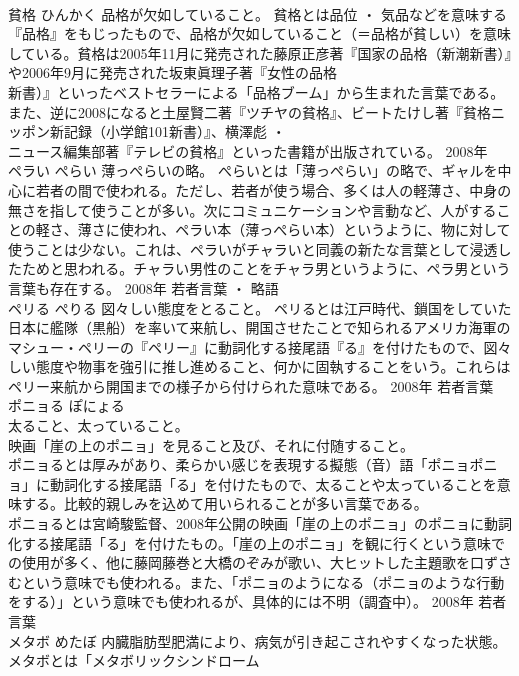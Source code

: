 \documentclass[8pt]{extreport}
\begin{document}
\begin{CJK}{UTF8}{min}
\\	貧格	ひんかく	品格が欠如していること。	貧格とは品位 ・ 気品などを意味する『品格』をもじったもので、品格が欠如していること（＝品格が貧しい）を意味している。貧格は2005年11月に発売された藤原正彦著『国家の品格（新潮新書）』や2006年9月に発売された坂東眞理子著『女性の品格
\\	新書）』といったベストセラーによる「品格ブーム」から生まれた言葉である。また、逆に2008になると土屋賢二著『ツチヤの貧格』、ビートたけし著『貧格ニッポン新記録（小学館101新書）』、横澤彪 ・ 
\\	ニュース編集部著『テレビの貧格』といった書籍が出版されている。	2008年	
\\	ペラい	ぺらい	薄っぺらいの略。	ぺらいとは「薄っぺらい」の略で、ギャルを中心に若者の間で使われる。ただし、若者が使う場合、多くは人の軽薄さ、中身の無さを指して使うことが多い。次にコミュニケーションや言動など、人がすることの軽さ、薄さに使われ、ペラい本（薄っぺらい本）というように、物に対して使うことは少ない。これは、ペラいがチャラいと同義の新たな言葉として浸透したためと思われる。チャラい男性のことをチャラ男というように、ペラ男という言葉も存在する。	2008年	若者言葉 ・ 略語	
\\	ペリる	ぺりる	図々しい態度をとること。	ペリるとは江戸時代、鎖国をしていた日本に艦隊（黒船）を率いて来航し、開国させたことで知られるアメリカ海軍のマシュー・ペリーの『ペリー』に動詞化する接尾語『る』を付けたもので、図々しい態度や物事を強引に推し進めること、何かに固執することをいう。これらはペリー来航から開国までの様子から付けられた意味である。	2008年	若者言葉	
\\	ポニョる	ぽにょる	
\\	太ること、太っていること。 
\\	映画「崖の上のポニョ」を見ること及び、それに付随すること。	
\\	ポニョるとは厚みがあり、柔らかい感じを表現する擬態（音）語「ポニョポニョ」に動詞化する接尾語「る」を付けたもので、太ることや太っていることを意味する。比較的親しみを込めて用いられることが多い言葉である。 
\\	ポニョるとは宮崎駿監督、2008年公開の映画「崖の上のポニョ」のポニョに動詞化する接尾語「る」を付けたもの。「崖の上のポニョ」を観に行くという意味での使用が多く、他に藤岡藤巻と大橋のぞみが歌い、大ヒットした主題歌を口ずさむという意味でも使われる。また、「ポニョのようになる（ポニョのような行動をする）」という意味でも使われるが、具体的には不明（調査中）。	2008年	若者言葉	
\\	メタボ	めたぼ	内臓脂肪型肥満により、病気が引き起こされやすくなった状態。	メタボとは「メタボリックシンドローム

\end{CJK}
\end{document}
